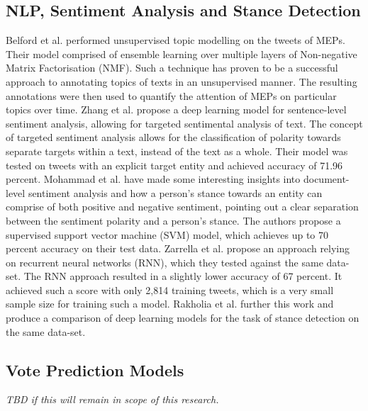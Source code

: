 \documentclass{article}
\begin{document}
\subsection{NLP, Sentiment Analysis and Stance Detection} \label{backgroundNLP}

Belford et al. \cite{Belford2016TweetingEA} performed unsupervised topic modelling on the tweets of MEPs. Their model comprised of ensemble learning over multiple layers of 
Non-negative Matrix Factorisation (NMF). Such a technique has proven to be a successful approach to annotating topics of texts in an unsupervised manner. The resulting annotations 
were then used to quantify the attention of MEPs on particular topics over time.
\newline
\newline
Zhang et al. \cite{Zhang2016GatedNN} propose a deep learning model for sentence-level sentiment analysis, allowing for targeted sentimental analysis of text. The concept of targeted 
sentiment analysis allows for the classification of polarity towards separate targets within a text, instead of the text as a whole. Their model was tested on tweets with an explicit 
target entity and achieved accuracy of 71.96 percent.
\newline
\newline
Mohammad et al. \cite{Mohammad2017StanceAS} have made some interesting insights into document-level sentiment analysis and how a person's stance towards an entity can comprise of 
both positive and negative sentiment, pointing out a clear separation between the sentiment polarity and a person's stance. The authors propose a supervised support vector machine 
(SVM) model, which achieves up to 70 percent accuracy on their test data. Zarrella et al. \cite{Zarrella2016MITREAS} propose an approach relying on recurrent neural networks (RNN), 
which they tested against the same data-set. The RNN approach resulted in a slightly lower accuracy of 67 percent. It achieved such a score with only 2,814 training tweets, which is 
a very small sample size for training such a model. Rakholia et al. \cite{Rakholia2017IsIT} further this work and produce a comparison of deep learning models for the task of stance 
detection on the same data-set.

\subsection{Vote Prediction Models}
\textit{TBD if this will remain in scope of this research.}
\end{document}
